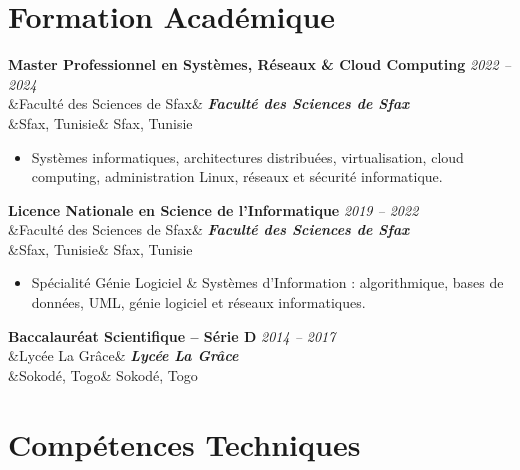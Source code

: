 \documentclass[11pt,a4paper]{article}
\newcommand{\cventry}[4]{%
    \needspace{3\baselineskip}%
    \noindent\textbf{\large #1}
    \hfill
    {\small\color{secondary}\textit{#2}}\\[2pt]%
    \ifx&#3&\else
        \noindent\textbf{\textit{#3}}\\[3pt]%
    \fi
    \ifx&#4&\else
        \noindent #4%
    \fi
    \vspace{6pt}\par
}
\begin{document}

\section{Formation Académique}

\cventry
{Master Professionnel en Systèmes, Réseaux \& Cloud Computing}
{2022 -- 2024}
{Faculté des Sciences de Sfax}
{Sfax, Tunisie}

\begin{itemize}

    \item Systèmes informatiques, architectures distribuées,
    virtualisation, cloud computing, administration Linux,
    réseaux et sécurité informatique.

\end{itemize}

\vspace{4pt}

\cventry
{Licence Nationale en Science de l'Informatique}
{2019 -- 2022}
{Faculté des Sciences de Sfax}
{Sfax, Tunisie}

\begin{itemize}

    \item Spécialité Génie Logiciel \& Systèmes d'Information :
    algorithmique, bases de données, UML, génie logiciel
    et réseaux informatiques.

\end{itemize}

\vspace{4pt}

\cventry
{Baccalauréat Scientifique -- Série D}
{2014 -- 2017}
{Lycée La Grâce}
{Sokodé, Togo}


\section{Compétences Techniques}
\end{document}
